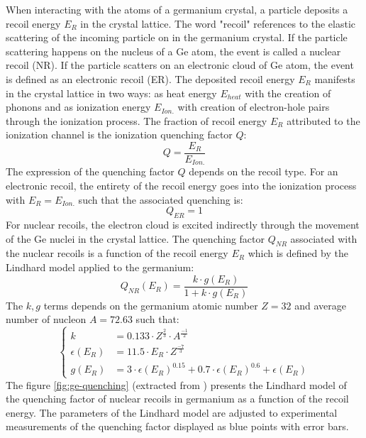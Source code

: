 When interacting with the atoms of a germanium crystal, a particle deposits a recoil energy $E_R$ in the crystal lattice. The word "recoil" references to the elastic scattering of the incoming particle on in the germanium crystal. If the particle scattering happens on the nucleus of a Ge atom, the event is called a nuclear recoil (NR). If the particle scatters on an electronic cloud of Ge atom, the event is defined as an electronic recoil (ER). The deposited recoil energy $E_R$ manifests in the crystal lattice in two ways: as heat energy $E_{heat}$ with the creation of phonons and as ionization energy $E_{Ion.}$ with creation of electron-hole pairs through the ionization process. The fraction of recoil energy $E_R$ attributed to the ionization channel is the ionization quenching factor $Q$:
\begin{equation}
\label{eq:quenching}
Q = \frac{E_R}{E_{Ion.}}
\end{equation}
The expression of the quenching factor $Q$ depends on the recoil type. For an electronic recoil, the entirety of the recoil energy goes into the ionization process with $E_R = E_{Ion.}$ such that the associated quenching is:
\begin{equation}
Q_{ER} = 1
\end{equation}
For nuclear recoils, the electron cloud is excited indirectly through the movement of the Ge nuclei in the crystal lattice. The quenching factor $Q_{NR}$ associated with the nuclear recoils is a function of the recoil energy $E_R$ which is defined by the Lindhard model \cite{Lindhard:1963} applied to the germanium:
\begin{equation}
\label{eq:lindhard}
Q_{NR}(E_R) = \frac{k \cdot g(E_R)}{1+k \cdot g(E_R)}
\end{equation}
The $k,g$ terms depends on the germanium atomic number $Z=32$ and average number of nucleon $A=72.63$ such that:
\begin{equation}
\begin{cases}
k &= 0.133 \cdot Z^\frac{2}{3} \cdot A^\frac{-1}{2}
\\
\epsilon(E_R) &= 11.5 \cdot E_R \cdot Z^\frac{-7}{3}
\\
g(E_R) &= 3 \cdot \epsilon(E_R)^{0.15} + 0.7 \cdot\epsilon(E_R)^{0.6} + \epsilon(E_R) 
\end{cases}
\end{equation}
The figure \ref{fig:ge-quenching} (extracted from \cite{Benoit:2006qc}) presents the Lindhard model of the quenching factor of nuclear recoils in germanium as a function of the recoil energy. The parameters of the Lindhard model are adjusted to experimental measurements of the quenching factor displayed as blue points with error bars. 

